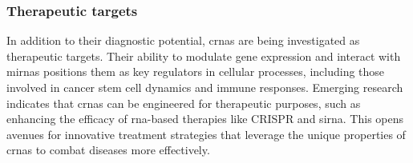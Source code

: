 \subsubsection{Therapeutic targets}
In addition to their diagnostic potential, \glspl{crna} are being investigated
as therapeutic targets.
Their ability to modulate gene expression and interact with \glspl{mirna}
positions them as key regulators in cellular processes, including those
involved in cancer stem cell dynamics and immune
responses\supercite{cheng_emerging_2023}.
Emerging research indicates that \glspl{crna} can be engineered for therapeutic
purposes, such as enhancing the efficacy of \gls{rna}-based therapies like
CRISPR and \gls{sirna}\supercite{wesselhoeft_engineering_2018}.
This opens avenues for innovative treatment strategies that leverage the unique
properties of \glspl{crna} to combat diseases more effectively.
